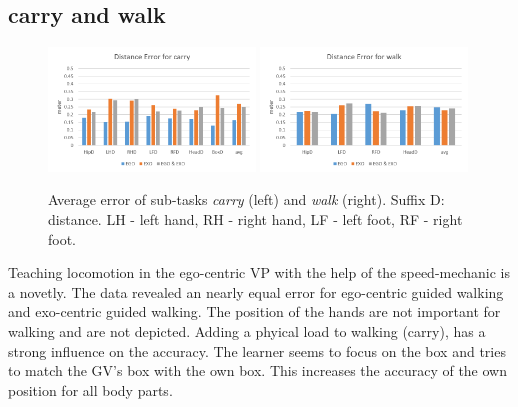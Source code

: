 \subsection{carry and walk}
\begin{figure}[htb]
	\centering
	\includegraphics[width=0.49\textwidth]{figures/distanceErrorCarry.png}
	\includegraphics[width=0.49\textwidth]{figures/distanceErrorWalk.png}
	\caption[Average error of sub-tasks \textit{carry} and \textit{walk}]{Average error of sub-tasks  \textit{carry} (left) and \textit{walk} (right). Suffix D: distance. LH - left hand, RH - right hand, LF - left foot, RF - right foot.}
	\label{fig:walkError}
\end{figure}
Teaching locomotion in the ego-centric VP with the help of the speed-mechanic is a novetly. The data revealed an nearly equal error for ego-centric guided walking and exo-centric guided walking. The position of the hands are not important for walking and are not depicted. Adding a phyical load to walking (carry), has a strong influence on the accuracy. The learner seems to focus on the box and tries to match the GV's box with the own box. This increases the accuracy of the own position for all body parts.

